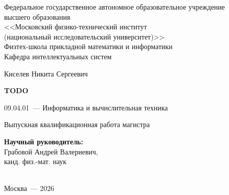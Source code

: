 \thispagestyle{empty}

\begin{titlepage}
%
\begin{center}
Федеральное государственное автономное образовательное учреждение\\ высшего образования\\
<<Московский физико-технический институт\\
(национальный исследовательский университет)>>\\
Физтех-школа прикладной математики и информатики\\
Кафедра интеллектуальных систем
\end{center}
%
\vspace{0pt plus5fill}
%
\begin{center}
\large{Киселев Никита Сергеевич}
\end{center}
%
\vspace{0pt}
%
\begin{center}
\textbf{\large\MakeUppercase{TODO}}
\end{center}
%
\vspace{0pt}
%
\begin{center}
09.04.01~--- Информатика и вычислительная техника
\end{center}
%
\vspace{0pt}
%
\begin{center}
Выпускная квалификационная работа магистра
\end{center}
%
\vspace{0pt plus2fill}
%
\begin{center}
\hfill\parbox{8,4cm}{\textbf{Научный руководитель:}\\
Грабовой Андрей Валериевич,\\
канд. физ.-мат. наук}\\
\vspace{0pt plus4fill}
Москва~--- 2026
\end{center}
%
\end{titlepage}